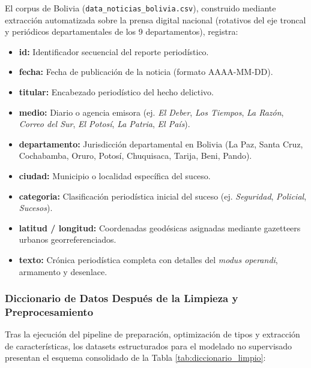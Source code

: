 El corpus de Bolivia (\texttt{data\_noticias\_bolivia.csv}), construido mediante extracción automatizada sobre la prensa digital nacional (rotativos del eje troncal y periódicos departamentales de los 9 departamentos), registra:
\begin{itemize}
    \item \textbf{id:} Identificador secuencial del reporte periodístico.
    \item \textbf{fecha:} Fecha de publicación de la noticia (formato AAAA-MM-DD).
    \item \textbf{titular:} Encabezado periodístico del hecho delictivo.
    \item \textbf{medio:} Diario o agencia emisora (ej. \textit{El Deber}, \textit{Los Tiempos}, \textit{La Razón}, \textit{Correo del Sur}, \textit{El Potosí}, \textit{La Patria}, \textit{El País}).
    \item \textbf{departamento:} Jurisdicción departamental en Bolivia (La Paz, Santa Cruz, Cochabamba, Oruro, Potosí, Chuquisaca, Tarija, Beni, Pando).
    \item \textbf{ciudad:} Municipio o localidad específica del suceso.
    \item \textbf{categoria:} Clasificación periodística inicial del suceso (ej. \textit{Seguridad}, \textit{Policial}, \textit{Sucesos}).
    \item \textbf{latitud / longitud:} Coordenadas geodésicas asignadas mediante gazetteers urbanos georreferenciados.
    \item \textbf{texto:} Crónica periodística completa con detalles del \textit{modus operandi}, armamento y desenlace.
\end{itemize}

\subsubsection{Diccionario de Datos Después de la Limpieza y Preprocesamiento}

Tras la ejecución del pipeline de preparación, optimización de tipos y extracción de características, los datasets estructurados para el modelado no supervisado presentan el esquema consolidado de la Tabla \ref{tab:diccionario_limpio}:

